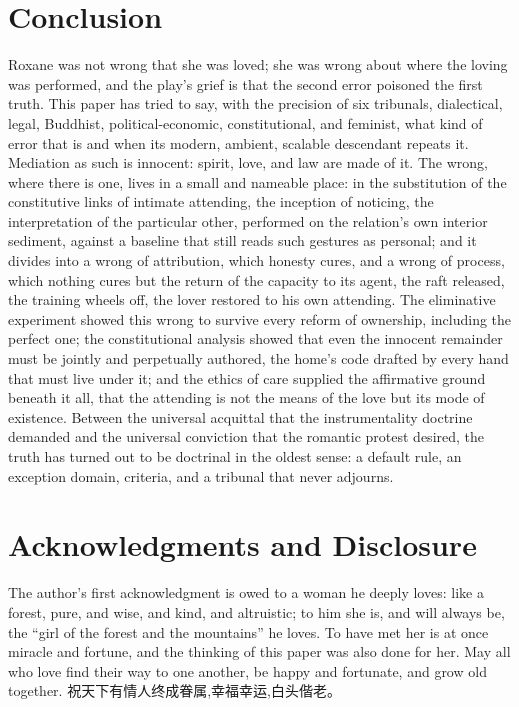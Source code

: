 \section{Conclusion}
\label{p02:sec:conclusion}

Roxane was not wrong that she was loved; she was wrong about where the loving was performed, and the play's grief is that the second error poisoned the first truth. This paper has tried to say, with the precision of six tribunals, dialectical, legal, Buddhist, political-economic, constitutional, and feminist, what kind of error that is and when its modern, ambient, scalable descendant repeats it. Mediation as such is innocent: spirit, love, and law are made of it. The wrong, where there is one, lives in a small and nameable place: in the substitution of the constitutive links of intimate attending, the inception of noticing, the interpretation of the particular other, performed on the relation's own interior sediment, against a baseline that still reads such gestures as personal; and it divides into a wrong of attribution, which honesty cures, and a wrong of process, which nothing cures but the return of the capacity to its agent, the raft released, the training wheels off, the lover restored to his own attending. The eliminative experiment showed this wrong to survive every reform of ownership, including the perfect one; the constitutional analysis showed that even the innocent remainder must be jointly and perpetually authored, the home's code drafted by every hand that must live under it; and the ethics of care supplied the affirmative ground beneath it all, that the attending is not the means of the love but its mode of existence. Between the universal acquittal that the instrumentality doctrine demanded and the universal conviction that the romantic protest desired, the truth has turned out to be doctrinal in the oldest sense: a default rule, an exception domain, criteria, and a tribunal that never adjourns.

\section*{Acknowledgments and Disclosure}

The author's first acknowledgment is owed to a woman he deeply loves: like a forest, pure, and wise, and kind, and altruistic; to him she is, and will always be, the ``girl of the forest and the mountains'' he loves. To have met her is at once miracle and fortune, and the thinking of this paper was also done for her. May all who love find their way to one another, be happy and fortunate, and grow old together. {\cjkfont 祝天下有情人终成眷属,幸福幸运,白头偕老。}

